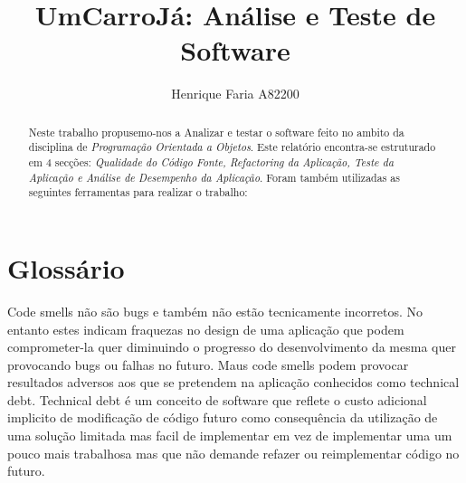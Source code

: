 

\title{UmCarroJá: Análise e Teste de Software}

\author{Henrique Faria A82200}




\maketitle

\begin{abstract}
Neste trabalho propusemo-nos a Analizar e testar o software feito no ambito da disciplina de \textit{Programação Orientada a Objetos}.\newline
Este relatório encontra-se estruturado em 4 secções: \textit{Qualidade do Código Fonte, Refactoring da Aplicação, Teste da Aplicação e Análise de Desempenho da Aplicação}.\newline
Foram também utilizadas as seguintes ferramentas para realizar o trabalho:
\end{abstract}

\section{Glossário}

Code smells não são bugs e também não estão tecnicamente incorretos. No entanto estes indicam fraquezas no design de uma aplicação que podem comprometer-la quer diminuindo o progresso do desenvolvimento da mesma quer provocando bugs ou falhas no futuro. Maus code smells podem provocar resultados adversos aos que se pretendem na aplicação conhecidos como technical debt.\newline
Technical debt é um conceito de software que reflete o custo adicional implicito de modificação de código futuro como consequência da utilização de uma solução limitada mas facil de implementar em vez de implementar uma um pouco mais trabalhosa mas que não demande refazer ou reimplementar código no futuro.


